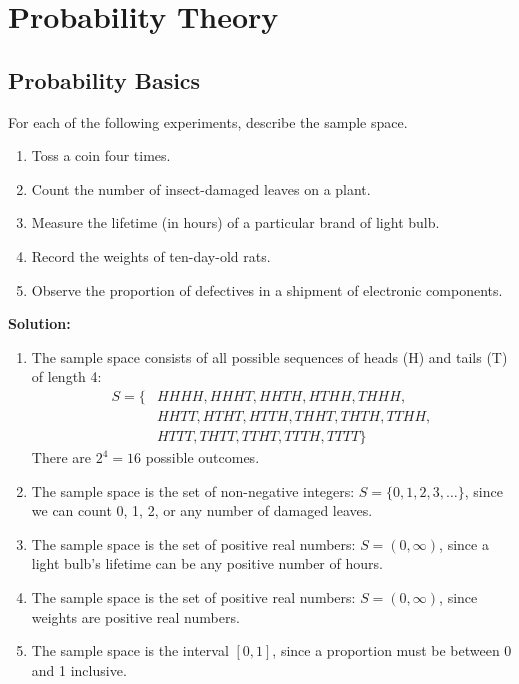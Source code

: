\chapter{Probability Theory}

\section{Probability Basics}

\begin{problembox}
For each of the following experiments, describe the sample space.
\begin{enumerate}[label=(\alph*)]
    \item Toss a coin four times.
    \item Count the number of insect-damaged leaves on a plant.
    \item Measure the lifetime (in hours) of a particular brand of light bulb.
    \item Record the weights of ten-day-old rats.
    \item Observe the proportion of defectives in a shipment of electronic components.
\end{enumerate}

\end{problembox}

\noindent\textbf{Solution:}
\begin{enumerate}[label=(\alph*)]
    \item The sample space consists of all possible sequences of heads (H) and tails (T) of length 4:
    \begin{align*}
    S = \{&HHHH, HHHT, HHTH, HTHH, THHH, \\
    &HHTT, HTHT, HTTH, THHT, THTH, TTHH, \\
    &HTTT, THTT, TTHT, TTTH, TTTT\}
    \end{align*}
    There are $2^4 = 16$ possible outcomes.
    
    \item The sample space is the set of non-negative integers: $S = \{0, 1, 2, 3, \ldots\}$, since we can count 0, 1, 2, or any number of damaged leaves.
    
    \item The sample space is the set of positive real numbers: $S = (0, \infty)$, since a light bulb's lifetime can be any positive number of hours.
    
    \item The sample space is the set of positive real numbers: $S = (0, \infty)$, since weights are positive real numbers.
    
    \item The sample space is the interval $[0, 1]$, since a proportion must be between 0 and 1 inclusive.
\end{enumerate}


